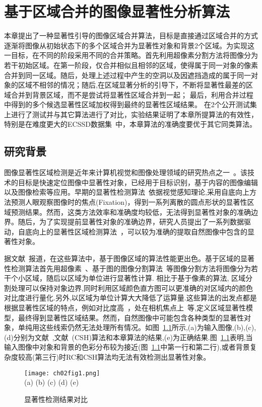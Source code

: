 

\chapter{基于区域合并的图像显著性分析算法}
\label{cha:SGRM}
本章提出了一种显著性引导的图像区域合并算法，目标是直接通过区域合并的方式逐渐将图像从初始状态下的多个区域合并为显著性对象和背景2个区域。为实现这一目标，在不同的阶段采用不同的合并策略。首先利用超像素分割方法将图像分为若干初始区域。在第一阶段，仅合并相似且相邻的区域，使得属于同一对象的像素合并到同一区域。随后，处理上述过程中产生的空洞以及因遮挡造成的属于同一对象的区域不相邻的情况；随后,在区域显著分析的引导下，不断将显著性最差的区域合并到背景区域，而不是尝试将显著性区域合并到一起； 最后，利用合并过程中得到的多个候选显著性区域加权得到最终的显著性区域结果。 在2个公开测试集上进行了测试并与其它算法进行了对比，实验结果证明了本章所提算法的有效性，特别是在难度更大的ECSSD数据集~\cite{ECSSD}中，本章算法的准确度要优于其它同类算法。
\section{研究背景}
\label{sec:background}
图像显著性区域检测是近年来计算机视觉和图像处理领域的研究热点之一~\cite{saliencySurvey}。该技术的目标是快速定位图像中显著性对象，已经用于目标识别，基于内容的图像编辑以及图像检索等应用。早期的显著性检测算法~\cite{itti}依据视觉感知理论,采用自底向上方法预测人眼观察图像时的焦点(Fixation)，得到一系列离散的圆点形状的显著性区域预测结果。然而，这类方法效率和准确度均较低，无法得到显著性对象的准确边界。随后，为了实现提前显著性对象的准确边界，研究人员提出了一系列数据驱动，自底向上的显著性区域检测算法~\cite{Achanta08,ChengPAMI,ufo,Yan2014Hierarchical}，可以较为准确的提取自然图像中包含的显著性对象。\par
据文献~报道，在这些算法中，基于图像区域的算法性能更出色。基于区域的显著性检测算法首先用超像素~\cite{SLIC}、基于图的图像分割算法~\cite{graphseg}等图像分割方法将图像分为若干个小区域，随后以区域为单位进行显著性计算. 相比于基于像素的算法, 区域分割处理可以保持对象边界,同时利用区域颜色直方图可以更准确的对区域内的颜色对比度进行量化.另外,以区域为单位计算大大降低了运算量.这些算法的出发点都是根据显著性区域的特点，例如对比度高~\cite{ChengPAMI}，处在相机焦点上~\cite{ufo}等,定义区域显著性模型，最终得到显著性区域结果。然而，自然图像中可能包含各种类型的显著性对象，单纯用这些线索仍然无法处理所有情况。如图~\ref{fig:saliencyCom}所示,(a)为输入图像,(b),(c),(d)分别为文献~,文献~(CSH)算法和本章算法的结果,(e)为正确结果.图~\ref{fig:saliencyCom}表明,当输入图像中对象和背景的色彩分布较为接近(图~\ref{fig:saliencyCom}中第一行和第二行),或者背景复杂度较高(第三行)时RC和CSH算法均无法有效检测出显著性对象。
\begin{figure}[h]
  \centering%
      {\texttt{[image: ch02fig1.png]}}\\
(a)\quad\quad\quad\quad\quad
(b)\quad\quad\quad\quad\quad\quad
(c)\quad\quad\quad\quad\quad\quad
(d)\quad\quad\quad\quad\quad
(e)
  \caption{显著性检测结果对比}
  \label{fig:saliencyCom}
\end{figure}

